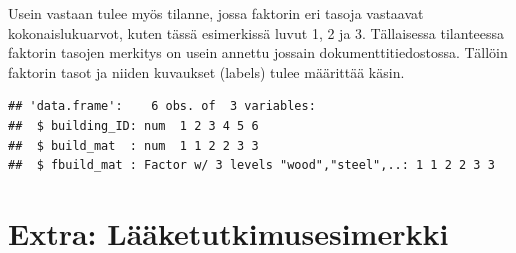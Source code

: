 \documentclass[
]{book}
\newenvironment{Shaded}{\begin{snugshade}}{\end{snugshade}}
\newcommand{\AttributeTok}[1]{\textcolor[rgb]{0.77,0.63,0.00}{#1}}
\newcommand{\CommentTok}[1]{\textcolor[rgb]{0.56,0.35,0.01}{\textit{#1}}}
\newcommand{\DecValTok}[1]{\textcolor[rgb]{0.00,0.00,0.81}{#1}}
\newcommand{\FunctionTok}[1]{\textcolor[rgb]{0.00,0.00,0.00}{#1}}
\newcommand{\NormalTok}[1]{#1}
\newcommand{\OtherTok}[1]{\textcolor[rgb]{0.56,0.35,0.01}{#1}}
\newcommand{\SpecialCharTok}[1]{\textcolor[rgb]{0.00,0.00,0.00}{#1}}
\newcommand{\StringTok}[1]{\textcolor[rgb]{0.31,0.60,0.02}{#1}}
\begin{document}
Usein vastaan tulee myös tilanne, jossa faktorin eri tasoja vastaavat kokonaislukuarvot, kuten tässä esimerkissä luvut 1, 2 ja 3. Tällaisessa tilanteessa faktorin tasojen merkitys on usein annettu jossain dokumenttitiedostossa. Tällöin faktorin tasot ja niiden kuvaukset (labels) tulee määrittää käsin.

\begin{Shaded}
\end{Shaded}

\begin{verbatim}
## 'data.frame':    6 obs. of  3 variables:
##  $ building_ID: num  1 2 3 4 5 6
##  $ build_mat  : num  1 1 2 2 3 3
##  $ fbuild_mat : Factor w/ 3 levels "wood","steel",..: 1 1 2 2 3 3
\end{verbatim}

\hypertarget{factor-extra}{%
\section{Extra: Lääketutkimusesimerkki}\label{factor-extra}}
\end{document}

